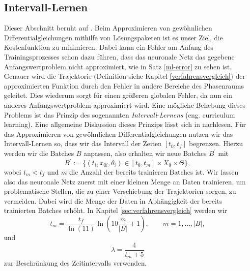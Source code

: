 \subsection{Intervall-Lernen}
\label{subsec:curriculum-learning}
Dieser Abschnitt beruht auf \cite{cedricflamantPersonlicheKommunikation2022}.
Beim Approximieren von gewöhnlichen Differentialgleichungen mithilfe von Lösungspaketen ist es unser Ziel, die
Kostenfunktion zu minimieren. Dabei kann ein Fehler am Anfang des Trainingsprozesses schon dazu
führen, dass das neuronale Netz das gegebene Anfangswertproblem nicht approximiert, wie in Satz \ref{ml-error} zu sehen
ist. Genauer wird die Trajektorie (Definition siehe Kapitel \ref{verfahrensvergleich}) der approximierten Funktion durch
den Fehler in andere Bereiche des Phasenraums geleitet. Dies wiederum sorgt für einen größeren globalen Fehler, da nun
ein anderes Anfangswertproblem approximiert wird. Eine mögliche Behebung dieses Problems ist das Prinzip des
sogenannten \textit{Intervall}-\textit{Lernens} (eng. curriculum learning). Eine allgemeine Diskussion dieses Prinzips
lässt sich in \cite{bengioCurriculumLearning2009} nachlesen. Für das Approximieren von gewöhnlichen
Differentialgleichungen nutzen wir das Intervall-Lernen so, dass wir das Intervall der Zeiten $[t_0, t_f]$ begrenzen.
Hierzu werden wir die Batches $B$ anpassen, also erhalten wir neue Batches $B^{\prime}$ mit
\[
    B^{\prime}:=  \{(t_i,x_{0i},\theta_i) \in [t_0,t_m] \times X_0 \times \Theta\},
\]
wobei $t_m<t_f$ und $m$ die Anzahl der bereits trainieren Batches ist. Wir lassen also das neuronale Netz zuerst mit
einer kleinen Menge an Daten trainieren, um problematische Stellen, die zu einer Verschiebung der Trajektorien sorgen,
zu vermeiden. Dabei wird die Menge der Daten in Abhängigkeit der bereits trainierten Batches erhöht. In Kapitel
\ref{sec:verfahrensvergleich} werden wir
\[
    t_m = \frac{t_f}{\ln(11)} \ln\left(10 \frac{m}{|B|} + 1 \right), \qquad m = 1, \dots, |B|,
\]
und
\[
    \lambda = \frac{4}{t_m + 5}
\]
zur Beschränkung des Zeitintervalls verwenden.

